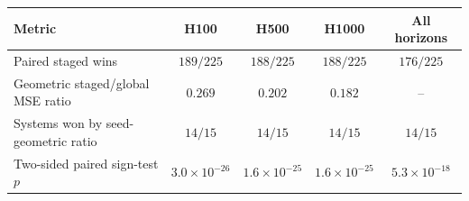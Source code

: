\begin{tabular}{lcccc}
\toprule
Metric & H100 & H500 & H1000 & All horizons \\
\midrule
Paired staged wins & $189/225$ & $188/225$ & $188/225$ & $176/225$ \\
Geometric staged/global MSE ratio & $0.269$ & $0.202$ & $0.182$ & -- \\
Systems won by seed-geometric ratio & $14/15$ & $14/15$ & $14/15$ & $14/15$ \\
Two-sided paired sign-test \(p\) & $3.0{\times}10^{-26}$ & $1.6{\times}10^{-25}$ & $1.6{\times}10^{-25}$ & $5.3{\times}10^{-18}$ \\
\bottomrule
\end{tabular}
